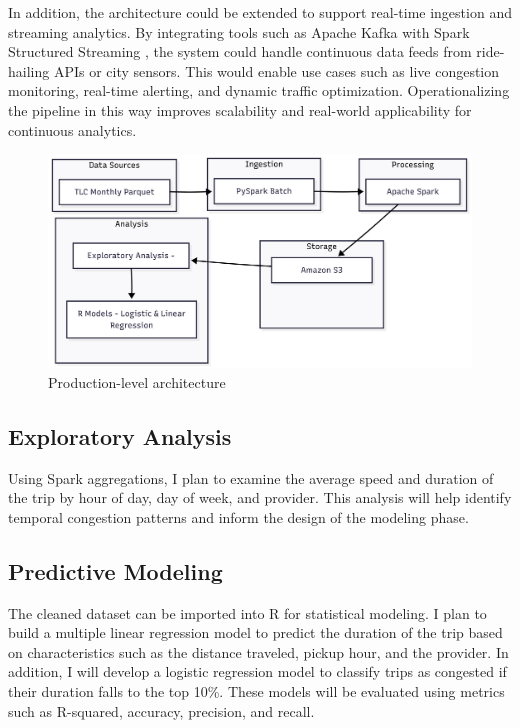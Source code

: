 \documentclass[12pt,letterpaper]{article}
\begin{document}
In addition, the architecture could be extended to support real-time ingestion and streaming analytics. By integrating tools such as Apache Kafka with Spark Structured Streaming \cite{structuredstreaming2024}, the system could handle continuous data feeds from ride-hailing APIs or city sensors. This would enable use cases such as live congestion monitoring, real-time alerting, and dynamic traffic optimization. Operationalizing the pipeline in this way improves scalability and real-world applicability for continuous analytics.

\begin{figure}
\includegraphics[width=\textwidth]{images/big-data-architecture.png}
\caption{Production-level architecture}
\label{fig:big-data-architecture}
\end{figure}


\subsection{Exploratory Analysis}
Using Spark aggregations, I plan to examine the average speed and duration of the trip by hour of day, day of week, and provider. This analysis will help identify temporal congestion patterns and inform the design of the modeling phase.

\subsection{Predictive Modeling}
The cleaned dataset can be imported into R for statistical modeling. I plan to build a multiple linear regression model to predict the duration of the trip based on characteristics such as the distance traveled, pickup hour, and the provider. In addition, I will develop a logistic regression model to classify trips as congested if their duration falls to the top 10\%. These models will be evaluated using metrics such as R-squared, accuracy, precision, and recall.
\end{document}
